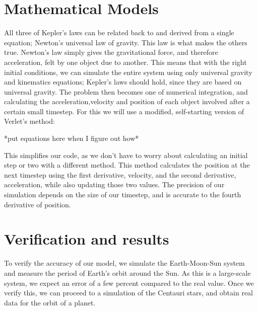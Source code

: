 \documentclass{article}
\begin{document}
\section{Mathematical Models}
All three of Kepler’s laws can be related back to and derived from a single equation; Newton’s universal law of gravity. This law is what makes the others true. Newton’s law simply gives the gravitational force, and therefore acceleration, felt by one object due to another. This means that with the right initial conditions, we can simulate the entire system using only universal gravity and kinematics equations; Kepler’s laws should hold, since they are based on universal gravity. The problem then becomes one of numerical integration, and calculating the acceleration,velocity and position of each object involved after a certain small timestep. For this we will use a modified, self-starting version of Verlet’s method:

    *put equations here when I figure out how*

This simplifies our code, as we don’t have to worry about calculating an initial step or two with a different method. This method calculates the position at the next timestep using the first derivative, velocity, and the second derivative, acceleration, while also updating those two values. The precision of our simulation depends on the size of our timestep, and is accurate to the fourth derivative of position.

\section{Verification and results}
To verify the accuracy of our model, we simulate the Earth-Moon-Sun system and measure the period of Earth’s orbit around the Sun. As this is a large-scale system, we expect an error of a few percent compared to the real value. Once we verify this, we can proceed to a simulation of the Centauri stars, and obtain real data for the orbit of a planet.
\end{document}
